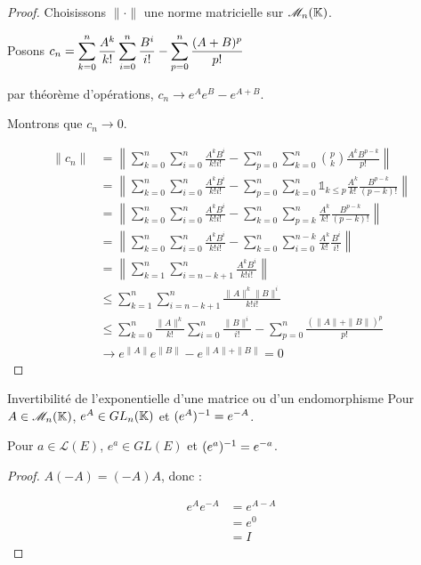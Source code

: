 \begin{proof}
    Choisissons $\| \cdot \|$ une norme matricielle sur $\mathscr M_n(\mathbb{K})$. 

    Posons $\displaystyle c_n = \sum_{k = 0}^{n} \frac{A^k}{k!} \sum_{i = 0}^{n } \frac{B^i}{i!} - \sum_{p = 0}^{n} \frac{(A + B)^p}{p!}$

    par théorème d'opérations, $c_n \to e^A e^B - e^{A + B}$.

    Montrons que $c_n \to 0$.  

    \begin{align}
        \| c_n \| & = \left\| \sum_{k = 0}^{n} \sum_{i = 0}^{n} \frac{A^k B^i}{k! i!} - \sum_{p = 0}^{n} \sum_{k = 0}^{n } \binom p k \frac{A^k B^{p - k}}{p!} \right\| \\
        & = \left\| \sum_{k = 0}^n \sum_{i = 0}^{n} \frac{A^k B^i}{k! i!} - \sum_{p = 0}^{n} \sum_{k = 0}^{n} \mathbb 1_{k \leqslant p} \frac{A^k}{k!} \frac{B^{p - k}}{(p - k)!} \right\| \\
        & = \left\| \sum_{k = 0}^{n} \sum_{i = 0}^{n} \frac{A^k B^i}{k! i!} - \sum_{k = 0}^{n} \sum_{p = k}^n \frac{A^k}{k!} \frac{B^{p - k}}{(p - k)!} \right\| \\
        & = \left\| \sum_{k = 0}^{n} \sum_{i = 0}^{n} \frac{A^k B^i}{k! i!} - \sum_{k = 0}^{n} \sum_{i = 0}^{n - k} \frac{A^k}{k!} \frac{B^{i}}{i!} \right\| \\
        & = \left\| \sum_{k = 1}^n \sum_{i = n - k + 1}^{n} \frac{A^k B^i}{k! i!} \right\| \\
        & \leqslant \sum_{k = 1}^{n } \sum_{i = n - k + 1}^{n} \frac{\| A \|^k \| B \|^i}{k! i!} \\
        & \leqslant \sum_{k = 0}^{n} \frac{\| A \|^k}{k!} \sum_{i = 0}^n \frac{\| B \|^i}{i!} - \sum_{p = 0}^{n} \frac{(\| A \| + \| B \|)^p}{p!} \\
        & \to e^{\| A \|} e^{\| B \|} - e^{\| A \| + \| B \|} = 0
    \end{align}
\end{proof}

\begin{corollairent}{Invertibilité de l'exponentielle d'une matrice ou d'un endomorphisme}{}
    Pour $A \in \mathscr M_n(\mathbb{K})$, $e^A \in GL_n(\mathbb{K})$ et $(e^A)^{-1} = e^{-A}$.

    Pour $a \in \mathscr L(E)$, $e^a \in GL(E)$ et $(e^a)^{-1} = e^{-a}$.
\end{corollairent}

\begin{proof}
    $A(-A) = (-A)A$, donc : 

    \begin{align}
        e^A e^{-A} & = e^{A - A} \\
        & = e^0 \\
        & = I
    \end{align}
\end{proof}

